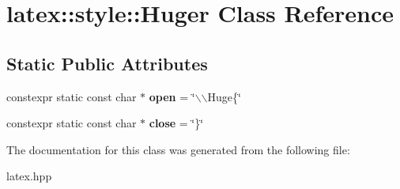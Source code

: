\hypertarget{classlatex_1_1style_1_1Huger}{\section{latex\-:\-:style\-:\-:\-Huger \-Class \-Reference}
\label{classlatex_1_1style_1_1Huger}
}
\subsection*{\-Static \-Public \-Attributes}
\begin{DoxyCompactItemize}
\item 
\hypertarget{classlatex_1_1style_1_1Huger_a87ec955bda49bd2d90115e03dc4b99d2}{constexpr static const char $\ast$ {\bfseries open} = \char`\"{}$\backslash$$\backslash$\-Huge\{\char`\"{}}\label{classlatex_1_1style_1_1Huger_a87ec955bda49bd2d90115e03dc4b99d2}

\item 
\hypertarget{classlatex_1_1style_1_1Huger_a24d1bf39b9473b2b30e6cb8c2929637b}{constexpr static const char $\ast$ {\bfseries close} = \char`\"{}\}\char`\"{}}\label{classlatex_1_1style_1_1Huger_a24d1bf39b9473b2b30e6cb8c2929637b}

\end{DoxyCompactItemize}


\-The documentation for this class was generated from the following file\-:\begin{DoxyCompactItemize}
\item 
latex.\-hpp\end{DoxyCompactItemize}

